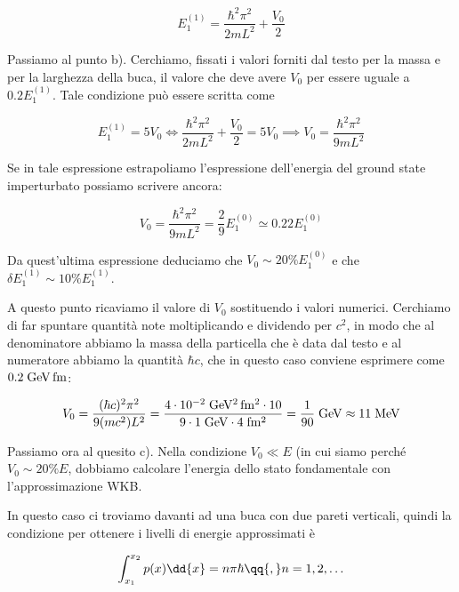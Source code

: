 \begin{soluzione}
   \begin{equation*}
      E_1^{(1)}
      =\frac{\hbar^2 \pi^2}{2mL^2} + \frac{V_0}{2}
   \end{equation*}
   
   Passiamo al punto b). Cerchiamo, fissati i valori forniti dal testo per la massa e per la larghezza della buca, il valore che deve avere $V_0$ per essere uguale a $0.2E_1^{(1)}$. Tale condizione può essere scritta come

   \begin{equation*}
      E_1^{(1)}=5V_0
      \iff
      \frac{\hbar^2 \pi^2}{2mL^2} + \frac{V_0}{2}=5V_0
      \implies
      V_0=\frac{\hbar^2 \pi^2}{9 m L^2}
   \end{equation*}

   Se in tale espressione estrapoliamo l'espressione dell'energia del ground state imperturbato possiamo scrivere ancora:

   \begin{equation*}
      V_0=\frac{\hbar^2 \pi^2}{9 m L^2}
      =\frac{2}{9} E_1^{(0)}
      \simeq 0.22 E_1^{(0)}
   \end{equation*}

   Da quest'ultima espressione deduciamo che $V_0 \sim 20\%E_1^{(0)}$ e che $\delta E_1^{(1)} \sim 10\%E_1^{(1)}$.

   A questo punto ricaviamo il valore di $V_0$ sostituendo i valori numerici. Cerchiamo di far spuntare quantità note moltiplicando e dividendo per $c^2$, in modo che al denominatore abbiamo la massa della particella che è data dal testo e al numeratore abbiamo la quantità $\hbar c$, che in questo caso conviene esprimere come $0.2 \; \rm GeV \, fm$:

   \begin{equation*}
      V_0
      =\frac{(\hbar c)^2 \pi^2}{9 (mc^2) L^2}
      =\rm \frac{4 \cdot 10^{-2} \; GeV^2\,fm^2 \cdot 10}{9 \cdot 1 \; GeV \cdot 4 \; fm^2}
      =\frac{1}{90} \; GeV
      \approx 11 \; MeV
   \end{equation*}

   Passiamo ora al quesito c). Nella condizione $V_0 \ll E$ (in cui siamo perché $V_0 \sim 20\% E$, dobbiamo calcolare l'energia dello stato fondamentale con l'approssimazione WKB.
   
   In questo caso ci troviamo davanti ad una buca con due pareti verticali, quindi la condizione per ottenere i livelli di energie approssimati è
   
   \begin{equation*}
      \int_{x_1}^{x_2} p(x) \dd{x}=n\pi\hbar
      \qq{,}
      n=1,2,\ldots
   \end{equation*}


\end{soluzione}
